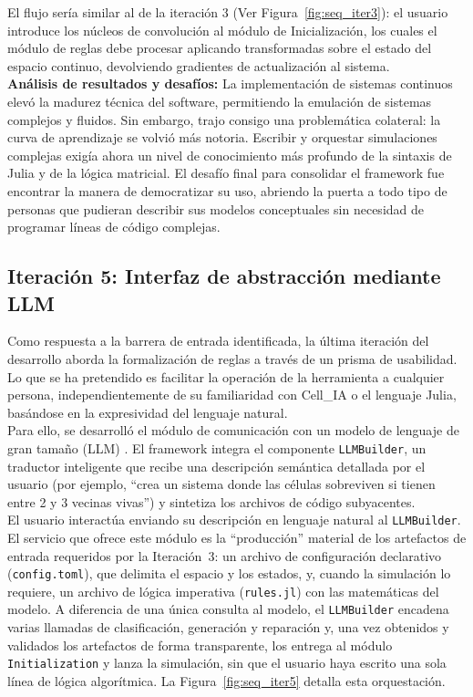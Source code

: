 \documentclass[runningheads]{llncs}
\begin{document}
El flujo sería similar al de la iteración 3 (Ver Figura~\ref{fig:seq_iter3}): el usuario introduce los núcleos de convolución al módulo de Inicialización, los cuales el módulo de reglas debe procesar aplicando transformadas sobre el estado del espacio continuo, devolviendo gradientes de actualización al sistema.\\


\textbf{Análisis de resultados y desafíos:} La implementación de sistemas continuos elevó la madurez técnica del software, permitiendo la emulación de sistemas complejos y fluidos. Sin embargo, trajo consigo una problemática colateral: la curva de aprendizaje se volvió más notoria. Escribir y orquestar simulaciones complejas exigía ahora un nivel de conocimiento más profundo de la sintaxis de Julia y de la lógica matricial. El desafío final para consolidar el framework fue encontrar la manera de democratizar su uso, abriendo la puerta a todo tipo de personas que pudieran describir sus modelos conceptuales sin necesidad de programar líneas de código complejas.

\subsection{Iteración 5: Interfaz de abstracción mediante LLM}
Como respuesta a la barrera de entrada identificada, la última iteración del desarrollo aborda la formalización de reglas a través de un prisma de usabilidad. Lo que se ha pretendido es facilitar la operación de la herramienta a cualquier persona, independientemente de su familiaridad con Cell\_IA o el lenguaje Julia, basándose en la expresividad del lenguaje natural.\\

Para ello, se desarrolló el módulo de comunicación con un modelo de lenguaje de gran tamaño (LLM) \cite{ref_llm, ref_llm2, ref_qwen}. El framework integra el componente \texttt{LLMBuilder}, un traductor inteligente que recibe una descripción semántica detallada por el usuario (por ejemplo, ``crea un sistema donde las células sobreviven si tienen entre 2 y 3 vecinas vivas'') y sintetiza los archivos de código subyacentes.\\

El usuario interactúa enviando su descripción en lenguaje natural al
\texttt{LLMBuilder}. El servicio que ofrece este módulo es la ``producción''
material de los artefactos de entrada requeridos por la Iteración~3: un archivo
de configuración declarativo (\texttt{config.toml}), que delimita el espacio y
los estados, y, cuando la simulación lo requiere, un archivo de lógica
imperativa (\texttt{rules.jl}) con las matemáticas del modelo. A diferencia de
una única consulta al modelo, el \texttt{LLMBuilder} encadena varias llamadas de clasificación, generación y reparación y, una vez obtenidos y validados los
artefactos de forma transparente, los entrega al módulo \texttt{Initialization}
y lanza la simulación, sin que el usuario haya escrito una sola línea de lógica
algorítmica. La Figura~\ref{fig:seq_iter5} detalla esta orquestación.
\end{document}
